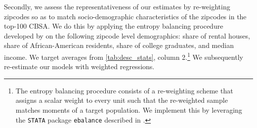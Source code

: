 Secondly, we assess the representativeness of our estimates by re-weighting zipcodes so as to match 
socio-demographic characteristics of the zipcodes in the top-100 CBSA. We do this by applying the 
entropy balancing procedure developed by \cite{hainmueller2012entropy} on the following zipcode 
level demographics: share of rental houses, share of African-American residents, share of college 
graduates, and median income. We target averages from \autoref{tab:desc_stats}, column 
2.\footnote{The entropy balancing procedure consists of a re-weighting scheme that assigns a scalar 
	weight to every unit such that the re-weighted sample matches moments of a target population. We 
	implement this by leveraging the \texttt{STATA} package \texttt{ebalance} described in 
	\textcite{hainmueller2013ebalance}.} We subsequently re-estimate our models with weighted regressions.


%
%

